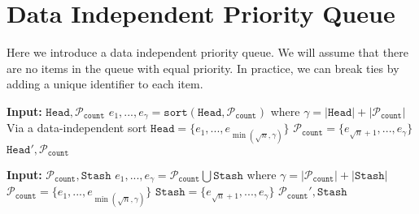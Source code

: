\section{Data Independent Priority Queue}
Here we introduce a data independent priority queue. We will assume that there are no items in the queue
with equal priority. In practice, we can break ties by adding a unique identifier to each item.

\newcommand{\DIPQhead}{\texttt{Head}}
\newcommand{\DIPQstash}{\texttt{Stash}}
\newcommand{\DIPQcounter}{{\texttt{count}}}
\newcommand{\DIPQpartition}{\mathcal{P}}
\newcommand{\MergeFill}{\texttt{MergeFill}}
\newcommand{\Fill}{\texttt{Fill}}
\newcommand{\sqrtn}{{\sqrt{n}}}
\newcommand{\good}{\mathcal{G}}
\newcommand{\bad}{\mathcal{B}}

\begin{algorithm}
	\caption{$\MergeFill$}
	\begin{algorithmic}[1]
			\State \textbf{Input:} $\DIPQhead, \DIPQpartition_\DIPQcounter$
			\State $e_1, ..., e_\gamma = \texttt{sort}(\DIPQhead, \DIPQpartition_\DIPQcounter)$ where $\gamma = |\DIPQhead| + |\DIPQpartition_\DIPQcounter|$ \Comment Via a data-independent sort
			\State $\DIPQhead = \{e_1, ..., e_{\min\left(\sqrtn, \gamma\right)}\}$
			\State $\DIPQpartition_\DIPQcounter = \{e_{\sqrtn + 1}, ..., e_\gamma\}$
			\State \Return $\DIPQhead', \DIPQpartition_\DIPQcounter$
	\end{algorithmic}
\end{algorithm}

\begin{algorithm}
	\caption{$\Fill$}
	\begin{algorithmic}[1]
			\State \textbf{Input:} $\DIPQpartition_\DIPQcounter, \DIPQstash$
			\State $e_1, ..., e_\gamma = \DIPQpartition_\DIPQcounter \bigcup \DIPQstash$ where $\gamma = |\DIPQpartition_\DIPQcounter| + |\DIPQstash|$
			\State $\DIPQpartition_\DIPQcounter = \{e_1, ..., e_{\min(\sqrtn, \gamma)}\}$
			\State $\DIPQstash = \{e_{\sqrtn + 1}, ..., e_\gamma\}$
			\State \Return $\DIPQpartition_\DIPQcounter', \DIPQstash$
	\end{algorithmic}
\end{algorithm}



